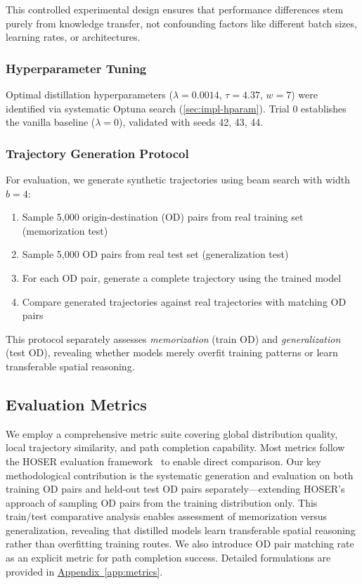 This controlled experimental design ensures that performance differences stem purely from knowledge transfer, not confounding factors like different batch sizes, learning rates, or architectures.

\subsubsection{Hyperparameter Tuning}

Optimal distillation hyperparameters ($\lambda = 0.0014$, $\tau = 4.37$, $w = 7$) were identified via systematic Optuna search (\autoref{sec:impl-hparam}). Trial 0 establishes the vanilla baseline ($\lambda = 0$), validated with seeds 42, 43, 44.

\subsubsection{Trajectory Generation Protocol}

For evaluation, we generate synthetic trajectories using beam search with width $b = 4$:

\begin{enumerate}[noitemsep,topsep=0pt]
    \item Sample 5,000 origin-destination (OD) pairs from real training set (memorization test)
    \item Sample 5,000 OD pairs from real test set (generalization test)
    \item For each OD pair, generate a complete trajectory using the trained model
    \item Compare generated trajectories against real trajectories with matching OD pairs
\end{enumerate}

This protocol separately assesses \emph{memorization} (train OD) and \emph{generalization} (test OD), revealing whether models merely overfit training patterns or learn transferable spatial reasoning.

\subsection{Evaluation Metrics}
\label{sec:eval-metrics}

We employ a comprehensive metric suite covering global distribution quality, local trajectory similarity, and path completion capability. Most metrics follow the HOSER evaluation framework~\cite{caoHolisticSemanticRepresentation2025,HOSEREvaluationMainipynb} to enable direct comparison. Our key methodological contribution is the systematic generation and evaluation on both training OD pairs and held-out test OD pairs separately---extending HOSER's approach of sampling OD pairs from the training distribution only. This train/test comparative analysis enables assessment of memorization versus generalization, revealing that distilled models learn transferable spatial reasoning rather than overfitting training routes. We also introduce OD pair matching rate as an explicit metric for path completion success. Detailed formulations are provided in \hyperref[app:metrics]{Appendix~\ref*{app:metrics}}.

